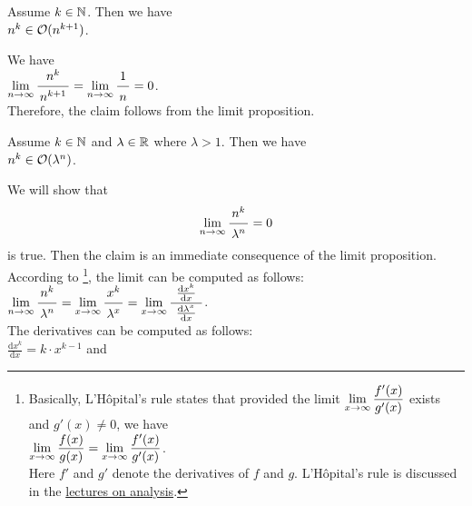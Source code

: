 \example
Assume $k \in {\mathbb N}$.  Then we have
\\[0.2cm]
\hspace*{1.3cm}
 $n^k \in \mathcal{O}(n^{k+1})$.

\proof
We have \\[0.2cm]
\hspace*{1.3cm} 
$\lim\limits_{n \rightarrow \infty} \bruch{n^{k}}{n^{k+1}} = \lim\limits_{n \rightarrow   \infty} \bruch{1}{n} = 0$.
\\[0.2cm]
Therefore, the claim follows from the limit proposition. 
\qeds

\example
Assume $k \in {\mathbb N}$ and $\lambda \in {\mathbb R}$ where $\lambda > 1$.  Then we have \\[0.2cm]
\hspace*{1.3cm} $n^k \in \mathcal{O}(\lambda^n)$.

\proof  We will show that 
\hspace*{1.3cm} 
\begin{equation}
  \label{eq:star}
  \lim\limits_{n \rightarrow \infty} \bruch{n^{k}}{\lambda^n} = 0  
\end{equation}
is true.  Then the claim is an immediate consequence of the limit proposition. 
According to \footnote{Basically, L'H\^opital's rule states that provided the
  limit $\displaystyle \lim\limits_{x \rightarrow \infty} \frac{f'(x)}{g'(x)}$ exists and $g'(x) \not= 0$, we have
  \\
  \hspace*{1.3cm}
  $\displaystyle\lim\limits_{x \rightarrow \infty} \frac{f(x)}{g(x)} = \lim\limits_{x \rightarrow \infty} \frac{f'(x)}{g'(x)}$.
  \\[0.2cm]
  Here $f'$ and $g'$ denote the derivatives of $f$ and $g$. 
  L'H\^opital's rule is discussed in the \href{https://github.com/karlstroetmann/Analysis/blob/master/Skript/analysis.pdf}{lectures on analysis}.
},  
the limit can be computed as follows: \\[0.2cm]
\hspace*{1.3cm} 
$\displaystyle \lim\limits_{n \rightarrow \infty} \bruch{n^{k}}{\lambda^n} =
\lim\limits_{x \rightarrow \infty} \bruch{x^{k}}{\lambda^x} =
\lim\limits_{x \rightarrow \infty} \bruch{\;\frac{\mathrm{d}x^{k}}{\mathrm{d}x}\;}{\frac{\mathrm{d}\lambda^x}{\mathrm{d}x}}$.
\\[0.2cm]
The derivatives can be computed as follows: \\[0.2cm]
\hspace*{1.3cm}
 $\displaystyle \frac{\mathrm{d}x^{k}}{\mathrm{d}x} = k \cdot x^{k-1}$ \quad and \quad 

